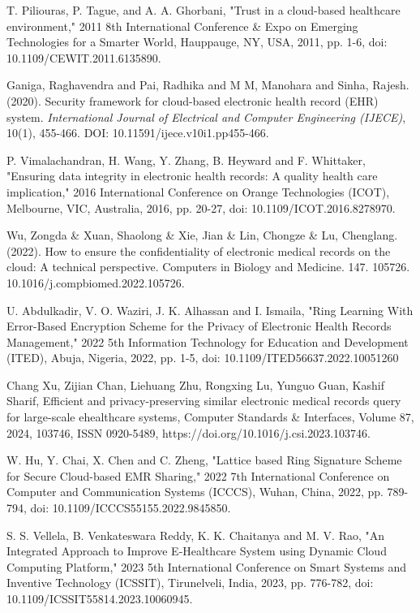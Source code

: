 \documentclass[runningheads]{llncs}
\begin{document}
\begin{thebibliography}{00}

 T. Piliouras, P. Tague, and A. A. Ghorbani, "Trust in a cloud-based healthcare environment," 2011 8th International Conference \& Expo on Emerging Technologies for a Smarter World, Hauppauge, NY, USA, 2011, pp. 1-6, doi: 10.1109/CEWIT.2011.6135890.

 Ganiga, Raghavendra and Pai, Radhika and M M, Manohara and Sinha, Rajesh. (2020). Security framework for cloud-based electronic health record (EHR) system. \textit{International Journal of Electrical and Computer Engineering (IJECE)}, 10(1), 455-466. DOI: 10.11591/ijece.v10i1.pp455-466.

 P. Vimalachandran, H. Wang, Y. Zhang, B. Heyward and F. Whittaker, "Ensuring data integrity in electronic health records: A quality health care implication," 2016 International Conference on Orange Technologies (ICOT), Melbourne, VIC, Australia, 2016, pp. 20-27, doi: 10.1109/ICOT.2016.8278970.

 Wu, Zongda \& Xuan, Shaolong \& Xie, Jian \& Lin, Chongze \& Lu, Chenglang. (2022). How to ensure the confidentiality of electronic medical records on the cloud: A technical perspective. Computers in Biology and Medicine. 147. 105726. 10.1016/j.compbiomed.2022.105726. 

 U. Abdulkadir, V. O. Waziri, J. K. Alhassan and I. Ismaila, "Ring Learning With Error-Based Encryption Scheme for the Privacy of Electronic Health Records Management," 2022 5th Information Technology for Education and Development (ITED), Abuja, Nigeria, 2022, pp. 1-5, doi: 10.1109/ITED56637.2022.10051260

 Chang Xu, Zijian Chan, Liehuang Zhu, Rongxing Lu, Yunguo Guan, Kashif Sharif, Efficient and privacy-preserving similar electronic medical records query for large-scale ehealthcare systems, Computer Standards \& Interfaces, Volume 87, 2024, 103746, ISSN 0920-5489, https://doi.org/10.1016/j.csi.2023.103746.

 W. Hu, Y. Chai, X. Chen and C. Zheng, "Lattice based Ring Signature Scheme for Secure Cloud-based EMR Sharing," 2022 7th International Conference on Computer and Communication Systems (ICCCS), Wuhan, China, 2022, pp. 789-794, doi: 10.1109/ICCCS55155.2022.9845850.

 S. S. Vellela, B. Venkateswara Reddy, K. K. Chaitanya and M. V. Rao, "An Integrated Approach to Improve E-Healthcare System using Dynamic Cloud Computing Platform," 2023 5th International Conference on Smart Systems and Inventive Technology (ICSSIT), Tirunelveli, India, 2023, pp. 776-782, doi: 10.1109/ICSSIT55814.2023.10060945.


\end{thebibliography}
\end{document}

